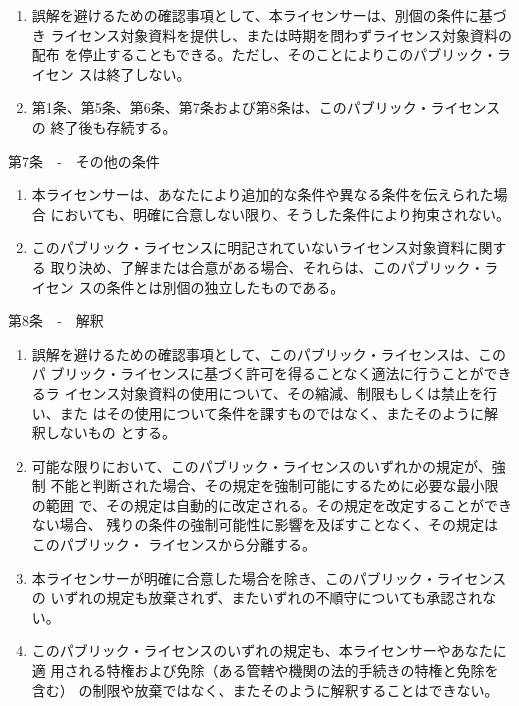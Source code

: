 {\begin{enumerate}
\item 誤解を避けるための確認事項として、本ライセンサーは、別個の条件に基づき
ライセンス対象資料を提供し、または時期を問わずライセンス対象資料の配布
を停止することもできる。ただし、そのことによりこのパブリック・ライセン
スは終了しない。
\item 第1条、第5条、第6条、第7条および第8条は、このパブリック・ライセンスの
終了後も存続する。
\end{enumerate}

第7条　‐　その他の条件

\begin{enumerate}
\renewcommand{\labelenumi}{\alph{enumi}.}
\renewcommand{\labelenumii}{\arabic{enumii}.}
\renewcommand{\labelenumiii}{\Alph{enumiii}.}
\item 本ライセンサーは、あなたにより追加的な条件や異なる条件を伝えられた場合
においても、明確に合意しない限り、そうした条件により拘束されない。
\item このパブリック・ライセンスに明記されていないライセンス対象資料に関する
取り決め、了解または合意がある場合、それらは、このパブリック・ライセン
スの条件とは別個の独立したものである。
\end{enumerate}

第8条　‐　解釈

\begin{enumerate}
\renewcommand{\labelenumi}{\alph{enumi}.}
\renewcommand{\labelenumii}{\arabic{enumii}.}
\renewcommand{\labelenumiii}{\Alph{enumiii}.}
\item 誤解を避けるための確認事項として、このパブリック・ライセンスは、このパ
ブリック・ライセンスに基づく許可を得ることなく適法に行うことができるラ
イセンス対象資料の使用について、その縮減、制限もしくは禁止を行い、また
はその使用について条件を課すものではなく、またそのように解釈しないもの
とする。
\item 可能な限りにおいて、このパブリック・ライセンスのいずれかの規定が、強制
不能と判断された場合、その規定を強制可能にするために必要な最小限の範囲
で、その規定は自動的に改定される。その規定を改定することができない場合、
残りの条件の強制可能性に影響を及ぼすことなく、その規定はこのパブリック・
ライセンスから分離する。
\item 本ライセンサーが明確に合意した場合を除き、このパブリック・ライセンスの
いずれの規定も放棄されず、またいずれの不順守についても承認されない。
\item このパブリック・ライセンスのいずれの規定も、本ライセンサーやあなたに適
用される特権および免除（ある管轄や機関の法的手続きの特権と免除を含む）
の制限や放棄ではなく、またそのように解釈することはできない。
\end{enumerate}

}
